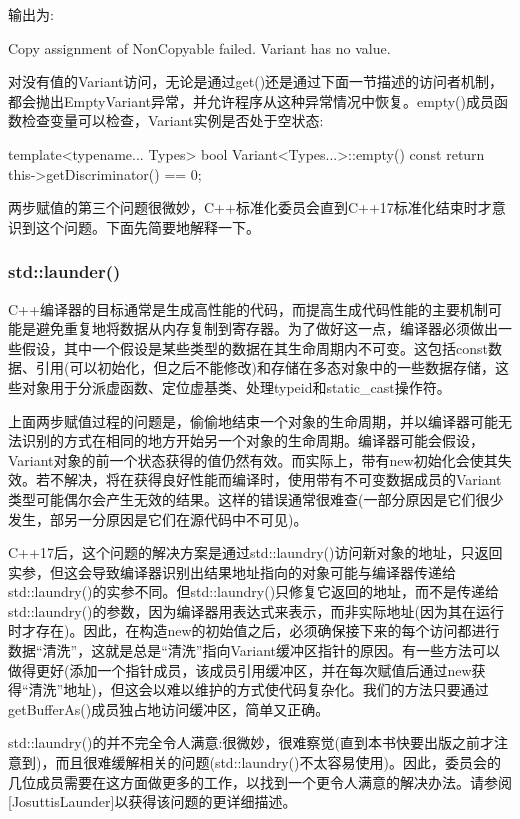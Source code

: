 输出为:

\begin{shell}
Copy assignment of NonCopyable failed.
Variant has no value.
\end{shell}

对没有值的Variant访问，无论是通过get()还是通过下面一节描述的访问者机制，都会抛出EmptyVariant异常，并允许程序从这种异常情况中恢复。empty()成员函数检查变量可以检查，Variant实例是否处于空状态:

\begin{cpp}
template<typename... Types>
bool Variant<Types...>::empty() const {
	return this->getDiscriminator() == 0;
}
\end{cpp}

两步赋值的第三个问题很微妙，C++标准化委员会直到C++17标准化结束时才意识到这个问题。下面先简要地解释一下。

\subsubsection{std::launder()}

C++编译器的目标通常是生成高性能的代码，而提高生成代码性能的主要机制可能是避免重复地将数据从内存复制到寄存器。为了做好这一点，编译器必须做出一些假设，其中一个假设是某些类型的数据在其生命周期内不可变。这包括const数据、引用(可以初始化，但之后不能修改)和存储在多态对象中的一些数据存储，这些对象用于分派虚函数、定位虚基类、处理typeid和static\_cast操作符。

上面两步赋值过程的问题是，偷偷地结束一个对象的生命周期，并以编译器可能无法识别的方式在相同的地方开始另一个对象的生命周期。编译器可能会假设，Variant对象的前一个状态获得的值仍然有效。而实际上，带有new初始化会使其失效。若不解决，将在获得良好性能而编译时，使用带有不可变数据成员的Variant类型可能偶尔会产生无效的结果。这样的错误通常很难查(一部分原因是它们很少发生，部另一分原因是它们在源代码中不可见)。

C++17后，这个问题的解决方案是通过std::laundry()访问新对象的地址，只返回实参，但这会导致编译器识别出结果地址指向的对象可能与编译器传递给std::laundry()的实参不同。但std::laundry()只修复它返回的地址，而不是传递给std::laundry()的参数，因为编译器用表达式来表示，而非实际地址(因为其在运行时才存在)。因此，在构造new的初始值之后，必须确保接下来的每个访问都进行数据“清洗”，这就是总是“清洗”指向Variant缓冲区指针的原因。有一些方法可以做得更好(添加一个指针成员，该成员引用缓冲区，并在每次赋值后通过new获得“清洗”地址)，但这会以难以维护的方式使代码复杂化。我们的方法只要通过getBufferAs()成员独占地访问缓冲区，简单又正确。

std::laundry()的并不完全令人满意:很微妙，很难察觉(直到本书快要出版之前才注意到)，而且很难缓解相关的问题(std::laundry()不太容易使用)。因此，委员会的几位成员需要在这方面做更多的工作，以找到一个更令人满意的解决办法。请参阅[JosuttisLaunder]以获得该问题的更详细描述。


